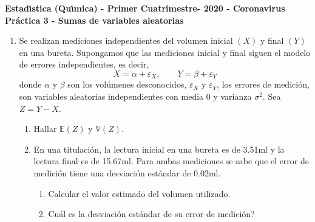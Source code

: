 \documentclass[11pt,a4paper,twoside]{article}%
\begin{document}
\begin{center}
\textbf{\textsf{Estad\'{\i}stica (Qu\'{\i}mica) - Primer Cuatrimestre- 2020 - Coronavirus}}\\
\vspace{0.2cm}
\textbf{Pr\'{a}ctica 3 - Sumas de variables aleatorias\vspace{-0.1in}}
\end{center}

\begin{enumerate}
\item Se realizan mediciones independientes del volumen inicial $\left(
X\right)  $ y final $\left(  Y\right)  $ en una bureta. Supongamos que las
mediciones inicial y final siguen el modelo de errores independientes, es
decir,
\[
X=\alpha+\varepsilon_{X},\qquad Y=\beta+\varepsilon_{Y}%
\]
donde $\alpha$ y $\beta$ son los vol\'{u}menes desconocidos, $\varepsilon_{X}$
y $\varepsilon_{Y}$, los errores de medici\'{o}n, son variables aleatorias
independientes con media 0 y varianza $\sigma^{2}$. Sea $Z=Y-X$.

\begin{enumerate}
\item Hallar $\mathbb{E}(Z)$ y $\mathbb{V}(Z)$.

\item En una titulaci\'{o}n, la lectura inicial en una bureta es de 3.51ml y
la lectura final es de 15.67ml. Para ambas mediciones se sabe que el error de
medici\'{o}n tiene una desviaci\'{o}n est\'{a}ndar de 0.02ml.

\begin{enumerate}
\item Calcular el valor estimado del volumen utilizado.

\item \textquestiondown Cu\'{a}l es la desviaci\'{o}n est\'{a}ndar de su error
de medici\'{o}n?
\end{enumerate}
\end{enumerate}





\end{enumerate}
\end{document}

